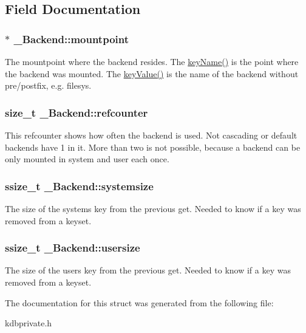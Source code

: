 \subsection{Field Documentation}
\hypertarget{struct__Backend_a5494dade5125f76ef8d77a24cdec1f84}{
\subsubsection[{mountpoint}]{$\ast$ {\bf \_\-Backend::mountpoint}}}
\label{struct__Backend_a5494dade5125f76ef8d77a24cdec1f84}
The mountpoint where the backend resides. The \hyperlink{group__keyname_ga8e805c726a60da921d3736cda7813513}{keyName()} is the point where the backend was mounted. The \hyperlink{group__keyvalue_ga6f29609c5da53c6dc26a98678d5752af}{keyValue()} is the name of the backend without pre/postfix, e.g. filesys. \hypertarget{struct__Backend_a033b9df8d33fd2575bf26818fcce5bb4}{
\subsubsection[{refcounter}]{\setlength{\rightskip}{0pt plus 5cm}size\_\-t {\bf \_\-Backend::refcounter}}}
\label{struct__Backend_a033b9df8d33fd2575bf26818fcce5bb4}
This refcounter shows how often the backend is used. Not cascading or default backends have 1 in it. More than two is not possible, because a backend can be only mounted in system and user each once. \hypertarget{struct__Backend_a0af9c2bc4e327a17df20de41918d34cc}{
\subsubsection[{systemsize}]{\setlength{\rightskip}{0pt plus 5cm}ssize\_\-t {\bf \_\-Backend::systemsize}}}
\label{struct__Backend_a0af9c2bc4e327a17df20de41918d34cc}
The size of the systems key from the previous get. Needed to know if a key was removed from a keyset. \hypertarget{struct__Backend_a86eba6e73242d79efed2a313d25bdd76}{
\subsubsection[{usersize}]{\setlength{\rightskip}{0pt plus 5cm}ssize\_\-t {\bf \_\-Backend::usersize}}}
\label{struct__Backend_a86eba6e73242d79efed2a313d25bdd76}
The size of the users key from the previous get. Needed to know if a key was removed from a keyset. 

The documentation for this struct was generated from the following file:\begin{DoxyCompactItemize}
\item 
kdbprivate.h\end{DoxyCompactItemize}
